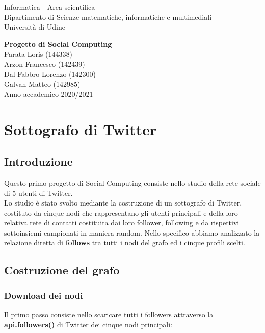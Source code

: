 \documentclass[a4paper,11pt]{report}
\begin{document}
\begin{titlepage}
  \clearpage\thispagestyle{empty}
  \centering
  \vspace{1cm}
  {\normalsize Informatica - Area scientifica \\  Dipartimento di Scienze matematiche, informatiche e multimediali\\  Università di Udine \par}
  \vspace{3cm}
  {\Huge \textbf{Progetto di Social Computing}}\\
  \vspace{4cm}
  {\Large  Parata Loris (144338) \\ Arzon Francesco (142439)\\ Dal Fabbro Lorenzo (142300)\\ Galvan Matteo (142985) \\ }
  \vspace{12cm}
  {\normalsize Anno accademico 2020/2021}
  \pagebreak
\end{titlepage}

\tableofcontents{}
\pagebreak
\chapter{Sottografo di Twitter}
\section{Introduzione}
Questo primo progetto di Social Computing consiste nello studio della rete sociale di 5 utenti di Twitter.\\
Lo studio è stato svolto mediante la costruzione di un sottografo di Twitter, costituto da cinque nodi che rappresentano gli utenti principali e della loro relativa rete di contatti costituita dai loro follower, following e da rispettivi sottoinsiemi campionati in maniera random.
Nello specifico abbiamo analizzato la relazione diretta di \textbf{follows} tra tutti i nodi del grafo ed i cinque profili scelti.

\section{Costruzione del grafo}

\subsection{Download dei nodi}
Il primo passo consiste nello scaricare tutti i followers attraverso la \textbf{api.followers()} di Twitter dei cinque nodi principali:
\end{document}
